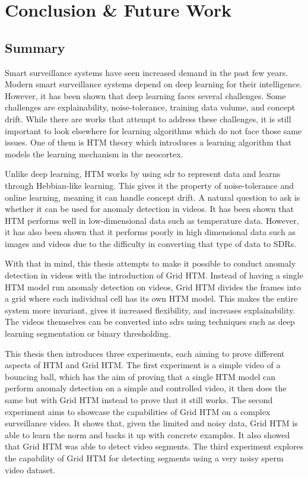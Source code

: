 \chapter{Conclusion \& Future Work}
\label{sec:conclusion}
\section{Summary}
Smart surveillance systems have seen increased demand in the past few years. Modern smart surveillance systems depend on deep learning for their intelligence. However, it has been shown that deep learning faces several challenges. Some challenges are explainability, noise-tolerance, training data volume, and concept drift. While there are works that attempt to address these challenges, it is still important to look elsewhere for learning algorithms which do not face those same issues. One of them is HTM theory which introduces a learning algorithm that models the learning mechanism in the neocortex.
\par
Unlike deep learning, HTM works by using \gls*{sdr} to represent data and learns through Hebbian-like learning. This gives it the property of noise-tolerance and online learning, meaning it can handle concept drift. A natural question to ask is whether it can be used for anomaly detection in videos. It has been shown that HTM performs well in low-dimensional data such as temperature data. However, it has also been shown that it performs poorly in high dimensional data such as images and videos due to the difficulty in converting that type of data to SDRs.
\par
With that in mind, this thesis attempts to make it possible to conduct anomaly detection in videos with the introduction of Grid HTM. Instead of having a single HTM model run anomaly detection on videos, Grid HTM divides the frames into a grid where each individual cell has its own HTM model. This makes the entire system more invariant, gives it increased flexibility, and increases explainability. The videos themselves can be converted into \glspl*{sdr} using techniques such as deep learning segmentation or binary thresholding.
\par
This thesis then introduces three experiments, each aiming to prove different aspects of HTM and Grid HTM. The first experiment is a simple video of a bouncing ball, which has the aim of proving that a single HTM model can perform anomaly detection on a simple and controlled video, it then does the same but with Grid HTM instead to prove that it still works. The second experiment aims to showcase the capabilities of Grid HTM on a complex surveillance video. It shows that, given the limited and noisy data, Grid HTM is able to learn the norm and backs it up with concrete examples. It also showed that Grid HTM was able to detect video segments. The third experiment explores the capability of Grid HTM for detecting segments using a very noisy sperm video dataset.

